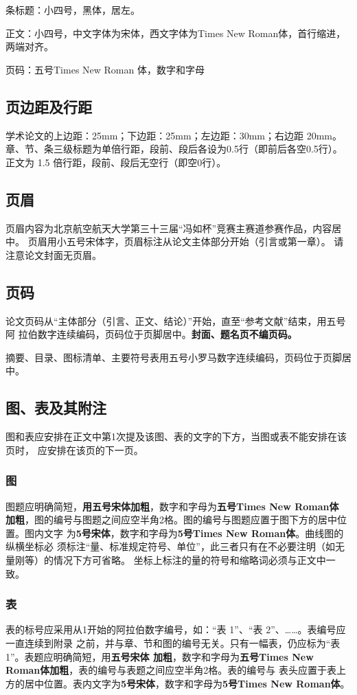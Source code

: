 \documentclass[zihao=-4]{ctexart}
\begin{document}
\begin{spacing}{1.5}
条标题：小四号，黑体，居左。

正文：小四号，中文字体为宋体，西文字体为Times New Roman体，首行缩进，两端对齐。

页码：五号Times New Roman 体，数字和字母\par

\subsection{页边距及行距}
学术论文的上边距：25mm；下边距：25mm；左边距：30mm；右边距 20mm。
章、节、条三级标题为单倍行距，段前、段后各设为0.5行（即前后各空0.5行）。
正文为 1.5 倍行距，段前、段后无空行（即空0行）。

\subsection{页眉}
页眉内容为北京航空航天大学第三十三届“冯如杯”竞赛主赛道参赛作品，内容居中。
页眉用小五号宋体字，页眉标注从论文主体部分开始（引言或第一章）。
请注意论文封面无页眉。

\subsection{页码}
论文页码从“主体部分（引言、正文、结论）”开始，直至“参考文献”结束，用五号阿
拉伯数字连续编码，页码位于页脚居中。\textbf{封面、题名页不编页码。}

摘要、目录、图标清单、主要符号表用五号小罗马数字连续编码，页码位于页脚居中。

\subsection{图、表及其附注}
图和表应安排在正文中第1次提及该图、表的文字的下方，当图或表不能安排在该页时，
应安排在该页的下一页。

\subsubsection{图}
图题应明确简短，\textbf{用五号宋体加粗}，数字和字母为\textbf{五号Times New Roman体
加粗}，图的编号与图题之间应空半角2格。图的编号与图题应置于图下方的居中位置。图内文字
为\textbf{5号宋体}，数字和字母为\textbf{5号Times New Roman体}。曲线图的纵横坐标必
须标注“量、标准规定符号、单位”，此三者只有在不必要注明（如无量刚等）的情况下方可省略。
坐标上标注的量的符号和缩略词必须与正文中一致。

\subsubsection{表}
表的标号应采用从1开始的阿拉伯数字编号，如：“表 1”、“表 2”、……。表编号应一直连续到附录
之前，并与章、节和图的编号无关。只有一幅表，仍应标为“表 1”。表题应明确简短，用\textbf{五号宋体
加粗}，数字和字母为\textbf{五号Times New Roman体加粗}，表的编号与表题之间应空半角2格。表的编号与
表头应置于表上方的居中位置。表内文字为\textbf{5号宋体}，数字和字母为\textbf{5号Times New Roman体}。  


\end{spacing}
\end{document}
